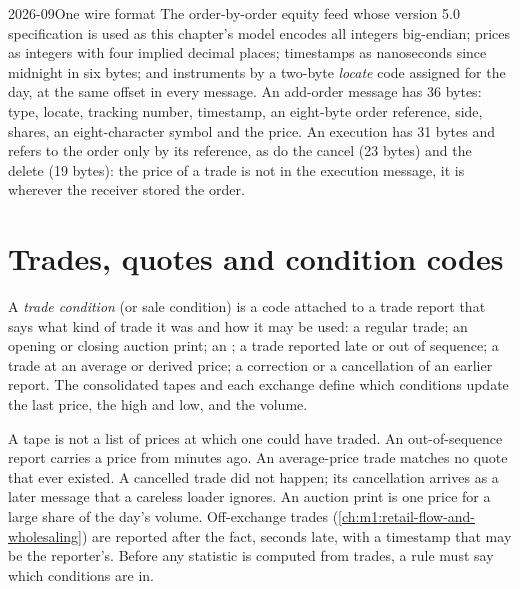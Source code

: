 \begin{dated}{2026-09}{One wire format}\label{dat:m1:reading-market-data:itch}
The order-by-order equity feed whose version 5.0 specification is used as
this chapter's model encodes all integers big-endian; prices as integers
with four implied decimal places; timestamps as nanoseconds since midnight
in six bytes; and instruments by a two-byte \emph{locate} code assigned for
the day, at the same offset in every message. An add-order message has 36
bytes: type, locate, tracking number, timestamp, an eight-byte order
reference, side, shares, an eight-character symbol and the price. An
execution has 31 bytes and refers to the order only by its reference, as do
the cancel (23 bytes) and the delete (19 bytes): the price of a trade is not
in the execution message, it is wherever the receiver stored the order.
\end{dated}

\section{Trades, quotes and condition codes}

\begin{definition}\label{def:m1:reading-market-data:condition}
A \emph{trade condition} (or sale condition) is a code
attached to a trade report that says what kind of trade it was and how it
may be used: a regular trade; an opening or closing auction print; an ; a trade reported late or out of sequence; a trade at an average or
derived price; a correction or a cancellation of an earlier report. The
consolidated tapes and each exchange define which conditions update the last
price, the high and low, and the volume.
\end{definition}

A tape is not a list of prices at which one could have traded. An
out-of-sequence report carries a price from minutes ago. An average-price
trade matches no quote that ever existed. A cancelled trade did not happen;
its cancellation arrives as a later message that a careless loader ignores.
An auction print is one price for a large share of the day's volume. Off-exchange
trades (\cref{ch:m1:retail-flow-and-wholesaling}) are reported after the
fact, seconds late, with a timestamp that may be the reporter's.
Before any statistic is computed from trades, a rule must say which
conditions are in.

